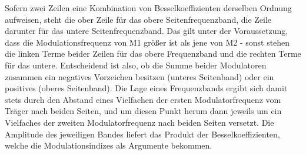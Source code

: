 Sofern zwei Zeilen eine Kombination von Besselkoeffizienten derselben Ordnung aufweisen, steht die ober Zeile für das obere Seitenfrequenzband, die Zeile darunter für das untere Seitenfrequenzband. Das gilt unter der Voraussetzung, dass die Modulationsfrequenz von M1 größer ist als jene von M2 - sonst stehen die linken Terme beider Zeilen für das obere Frequenzband und die rechten Terme für das untere. Entscheidend ist also, ob die Summe beider Modulatoren zusammen ein negatives Vorzeichen besitzen (unteres Seitenband) oder ein positives (oberes Seitenband). Die Lage eines Frequenzbands ergibt sich damit stets durch den Abstand eines Vielfachen der ersten Modulatorfrequenz vom Träger nach beiden Seiten, und um diesen Punkt herum dann jeweils um ein Vielfaches der zweiten Modulatorfrequenz nach beiden Seiten versetzt. Die Amplitude des jeweiligen Bandes liefert das Produkt der Besselkoeffizienten, welche die Modulationsindizes als Argumente bekommen. 

